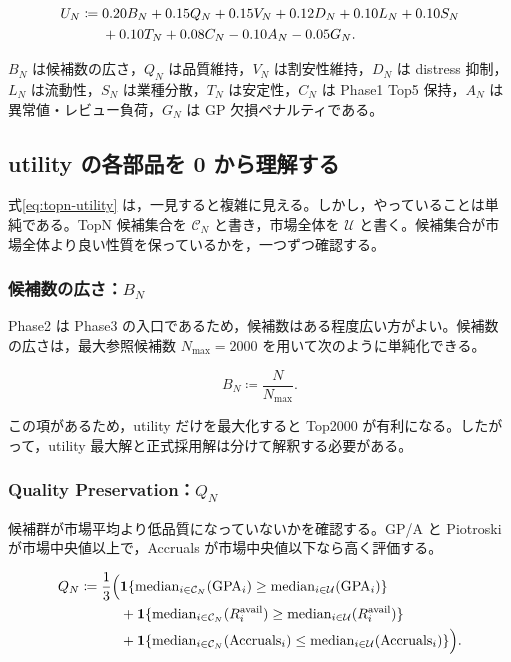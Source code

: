 \documentclass[a4paper,10pt]{article}
\newcommand{\GPA}{\mathrm{GPA}}
\newcommand{\Acc}{\mathrm{Accruals}}
\newcommand{\median}{\operatorname{median}}
\newcommand{\1}{\mathbf{1}}
\begin{document}
\begin{align}
U_N \coloneqq {}& 0.20 B_N + 0.15 Q_N + 0.15 V_N + 0.12 D_N + 0.10 L_N + 0.10 S_N \notag\\
&+0.10 T_N +0.08 C_N -0.10 A_N -0.05 G_N.
\label{eq:topn-utility}
\end{align}

$B_N$ は候補数の広さ，$Q_N$ は品質維持，$V_N$ は割安性維持，$D_N$ は distress 抑制，$L_N$ は流動性，$S_N$ は業種分散，$T_N$ は安定性，$C_N$ は Phase1 Top5 保持，$A_N$ は異常値・レビュー負荷，$G_N$ は GP 欠損ペナルティである。


\subsection{utility の各部品を 0 から理解する}
式\eqref{eq:topn-utility} は，一見すると複雑に見える。しかし，やっていることは単純である。TopN 候補集合を $\mathcal{C}_N$ と書き，市場全体を $\mathcal{U}$ と書く。候補集合が市場全体より良い性質を保っているかを，一つずつ確認する。

\subsubsection{候補数の広さ：$B_N$}
Phase2 は Phase3 の入口であるため，候補数はある程度広い方がよい。候補数の広さは，最大参照候補数 $N_{\max}=2000$ を用いて次のように単純化できる。

\begin{equation}
B_N \coloneqq \frac{N}{N_{\max}} .
\label{eq:breadth-score}
\end{equation}

この項があるため，utility だけを最大化すると Top2000 が有利になる。したがって，utility 最大解と正式採用解は分けて解釈する必要がある。

\subsubsection{Quality Preservation：$Q_N$}
候補群が市場平均より低品質になっていないかを確認する。GP/A と Piotroski が市場中央値以上で，Accruals が市場中央値以下なら高く評価する。

\begin{align}
Q_N \coloneqq \frac{1}{3}\Bigl(&\1\{\median_{i\in\mathcal{C}_N}(\GPA_i)\ge \median_{i\in\mathcal{U}}(\GPA_i)\} \notag\\
&+\1\{\median_{i\in\mathcal{C}_N}(R_i^{\mathrm{avail}})\ge \median_{i\in\mathcal{U}}(R_i^{\mathrm{avail}})\} \notag\\
&+\1\{\median_{i\in\mathcal{C}_N}(\Acc_i)\le \median_{i\in\mathcal{U}}(\Acc_i)\}\Bigr).
\label{eq:quality-score}
\end{align}
\end{document}

